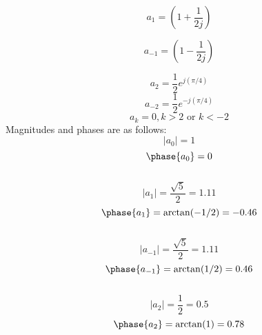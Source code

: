 \documentclass[10pt,a4paper, margin=1in]{article}
\begin{document}
\begin{enumerate}
\begin{enumerate}
    \begin{equation*}
        a_1 = (1 + \frac{1}{2j})
    \end{equation*}

    \begin{equation*}
        a_{-1} = (1 - \frac{1}{2j})
    \end{equation*}

    \begin{equation*}
        a_{2} = \frac{1}{2}e^{j(\pi/4)}
    \end{equation*}
        \begin{equation*}
        a_{-2} =  \frac{1}{2}e^{-j(\pi/4)}
    \end{equation*}
\begin{equation*}
    a_k = 0, k > 2 \text{ or }k < -2
\end{equation*}
Magnitudes and phases are as follows:
    \begin{equation*}
        |a_0| = 1
    \end{equation*}
    \begin{equation*}
        \phase{a_0} = 0 
    \end{equation*}
    \\
    \begin{equation*}
        |a_1| = \frac{\sqrt{5}}{2} = 1.11
    \end{equation*}
    \begin{equation*}
        \phase{a_1} = \arctan(-1/2) = -0.46
    \end{equation*}\\
        \begin{equation*}
        |a_{-1}| = \frac{\sqrt{5}}{2} = 1.11
    \end{equation*}
    \begin{equation*}
        \phase{a_{-1}} = \arctan(1/2) = 0.46
    \end{equation*}\\
        \begin{equation*}
        |a_{2}| = \frac{1}{2} = 0.5
    \end{equation*}
    \begin{equation*}
        \phase{a_{2}} = \arctan(1) = 0.78
    \end{equation*}\\


\end{enumerate}
\end{enumerate}
\end{document}
